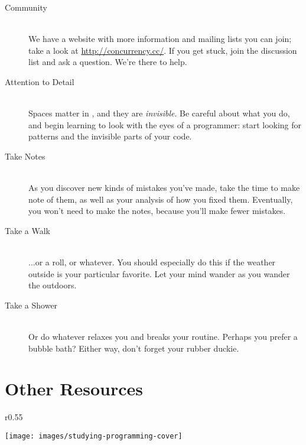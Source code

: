 \begin{description}
	\item[Community]\ \\ We have a website with more information and mailing lists you can join; take a look at \url{http://concurrency.cc/}. If you get stuck, join the discussion list and ask a question. We're there to help.
	\item[Attention to Detail]\ \\ Spaces matter in \plumbing, and they are {\em invisible}. Be careful about what you do, and begin learning to look with the eyes of a programmer: start looking for patterns and the invisible parts of your code.
	\item[Take Notes]\ \\ As you discover new kinds of mistakes you've made, take the time to make note of them, as well as your analysis of how you fixed them. Eventually, you won't need to make the notes, because you'll make fewer mistakes.
	\item[Take a Walk]\ \\ ...or a roll, or whatever. You should especially do this if the weather outside is your particular favorite. Let your mind wander as you wander the outdoors.
	\item[Take a Shower]\ \\ Or do whatever relaxes you and breaks your routine. Perhaps you prefer a bubble bath? Either way, don't forget your rubber duckie.
\end{description}

\newpage

\section{Other Resources}
\begin{wrapfigure}{r}{0.55\linewidth}
	  \begin{center}
    	\texttt{[image: images/studying-programming-cover]}
  \end{center}
\end{wrapfigure}

